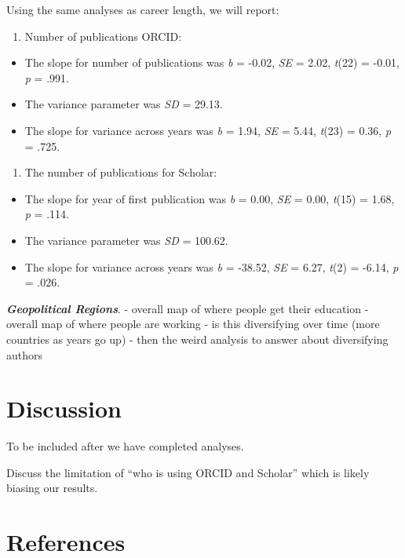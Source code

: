\documentclass[
  english,
  man]{apa6}
\providecommand{\tightlist}{%
  \setlength{\itemsep}{0pt}\setlength{\parskip}{0pt}}
\newlength{\cslhangindent}
\newlength{\cslentryspacingunit} %
\newenvironment{CSLReferences}[2] %
 {%
  \setlength{\parindent}{0pt}
  \ifodd #1
  \let\oldpar\par
  \def\par{\hangindent=\cslhangindent\oldpar}
  \fi
  \setlength{\parskip}{#2\cslentryspacingunit}
 }%
 {}
\begin{document}
Using the same analyses as career length, we will report:

\begin{enumerate}
\def\labelenumi{\arabic{enumi})}
\tightlist
\item
  Number of publications ORCID:
\end{enumerate}

\begin{itemize}
\tightlist
\item
  The slope for number of publications was \emph{b} = -0.02, \emph{SE} = 2.02, \emph{t}(22) = -0.01, \emph{p} = .991.
\item
  The variance parameter was \emph{SD} = 29.13.
\item
  The slope for variance across years was \emph{b} = 1.94, \emph{SE} = 5.44, \emph{t}(23) = 0.36, \emph{p} = .725.
\end{itemize}

\begin{enumerate}
\def\labelenumi{\arabic{enumi})}
\setcounter{enumi}{1}
\tightlist
\item
  The number of publications for Scholar:
\end{enumerate}

\begin{itemize}
\tightlist
\item
  The slope for year of first publication was \emph{b} = 0.00, \emph{SE} = 0.00, \emph{t}(15) = 1.68, \emph{p} = .114.
\item
  The variance parameter was \emph{SD} = 100.62.
\item
  The slope for variance across years was \emph{b} = -38.52, \emph{SE} = 6.27, \emph{t}(2) = -6.14, \emph{p} = .026.
\end{itemize}

\textbf{\emph{Geopolitical Regions}}.
- overall map of where people get their education
- overall map of where people are working
- is this diversifying over time (more countries as years go up)
- then the weird analysis to answer about diversifying authors

\hypertarget{discussion}{%
\section{Discussion}\label{discussion}}

To be included after we have completed analyses.

Discuss the limitation of ``who is using ORCID and Scholar'' which is likely biasing our results.

\newpage

\hypertarget{references}{%
\section{References}\label{references}}

\begingroup
\setlength{\parindent}{-0.5in}
\setlength{\leftskip}{0.5in}

\hypertarget{refs}{}
\begin{CSLReferences}{0}{0}
\end{CSLReferences}

\endgroup
\end{document}
